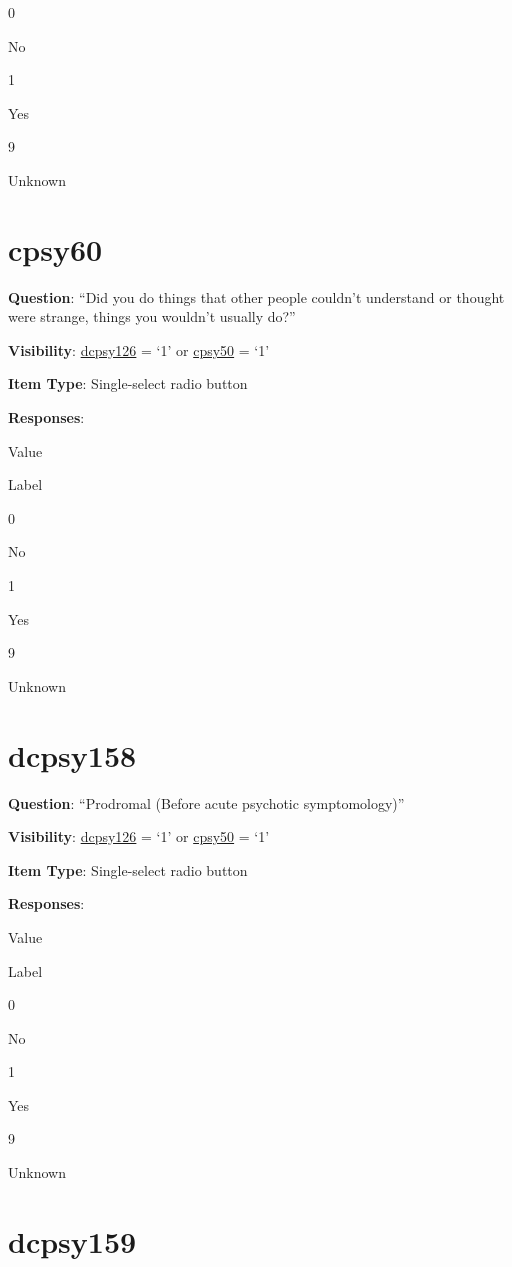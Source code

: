 \documentclass[]{book}
\begin{document}
0

No

1

Yes

9

Unknown

\hypertarget{cpsy60}{%
\section{cpsy60}\label{cpsy60}}

\textbf{Question}: ``Did you do things that other people couldn't understand or thought were strange, things you wouldn't usually do?''

\textbf{Visibility}: \protect\hyperlink{dcpsy126}{dcpsy126} = `1' or \protect\hyperlink{cpsy50}{cpsy50} = `1'

\textbf{Item Type}: Single-select radio button

\textbf{Responses}:

Value

Label

0

No

1

Yes

9

Unknown

\hypertarget{dcpsy158}{%
\section{dcpsy158}\label{dcpsy158}}

\textbf{Question}: ``Prodromal (Before acute psychotic symptomology)''

\textbf{Visibility}: \protect\hyperlink{dcpsy126}{dcpsy126} = `1' or \protect\hyperlink{cpsy50}{cpsy50} = `1'

\textbf{Item Type}: Single-select radio button

\textbf{Responses}:

Value

Label

0

No

1

Yes

9

Unknown

\hypertarget{dcpsy159}{%
\section{dcpsy159}\label{dcpsy159}}
\end{document}
